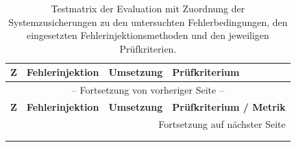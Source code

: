 \begin{longtable}{@{}p{}p{}p{}p{}@{}}
    \toprule
    \textbf{Z} & \textbf{Fehlerinjektion} & \textbf{Umsetzung} & \textbf{Prüfkriterium} \\
    \midrule
    \endfirsthead

    \multicolumn{4}{c}{-- Fortsetzung von vorheriger Seite --} \\
    \toprule
    \textbf{Z} & \textbf{Fehlerinjektion} & \textbf{Umsetzung} & \textbf{Prüfkriterium / Metrik} \\
    \midrule
    \endhead

    \midrule
    \multicolumn{4}{r}{\footnotesize Fortsetzung auf nächster Seite} \\
    \endfoot

    \bottomrule
    \addlinespace
    \caption[Testmatrix der Evaluation]{Testmatrix der Evaluation mit Zuordnung der Systemzusicherungen zu den untersuchten
    Fehlerbedingungen, den eingesetzten Fehlerinjektionsmethoden und den jeweiligen Prüfkriterien.}
    \label{tab:testmatrix} \\
    \endlastfoot


\end{longtable}
